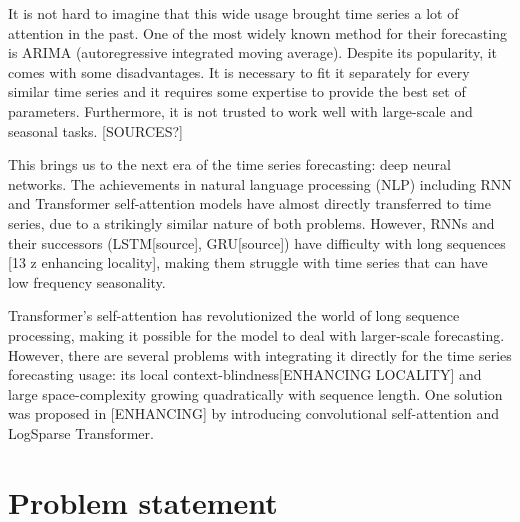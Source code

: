 \documentclass[en]{pracamgr}
\begin{document}
It is not hard to imagine that this wide usage brought time series a lot of attention in the past. One of the most widely known method for their forecasting is ARIMA (autoregressive integrated moving average). Despite its popularity, it comes with some disadvantages. It is necessary to fit it separately for every similar time series and it requires some expertise to provide the best set of parameters. Furthermore, it is not trusted to work well with large-scale and seasonal tasks. [SOURCES?]

This brings us to the next era of the time series forecasting: deep neural networks.
The achievements in natural language processing (NLP) including RNN and Transformer self-attention models have almost directly transferred to time series, due to a strikingly similar nature of both problems. However, RNNs and their successors (LSTM[source], GRU[source]) have difficulty with long sequences [13 z enhancing locality], making them struggle with time series that can have low frequency seasonality.


Transformer's self-attention has revolutionized the world of long sequence processing, making it possible for the model to deal with larger-scale forecasting. However, there are several problems with integrating it directly for the time series forecasting usage: its local context-blindness[ENHANCING LOCALITY] and large space-complexity growing quadratically with sequence length.
One solution was proposed in [ENHANCING] by introducing convolutional self-attention and LogSparse Transformer.





%

\section{Problem statement}\label{r:problemst}
\end{document}
